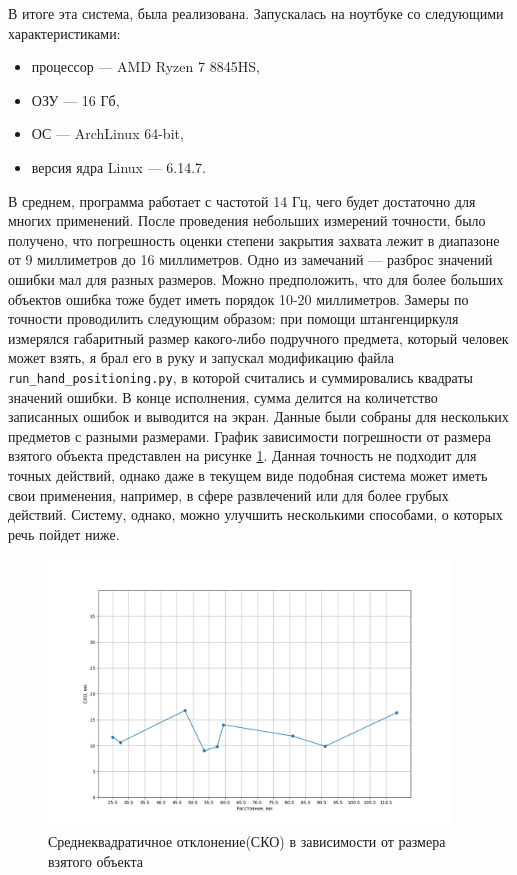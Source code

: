 \documentclass[12pt, a4paper]{article}
\begin{document}
В итоге эта система, была реализована. Запускалась на ноутбуке со следующими
характеристиками:
\begin{itemize}
  \item процессор --- AMD Ryzen 7 8845HS,
  \item ОЗУ --- 16 Гб,
  \item ОС --- ArchLinux 64-bit,
  \item версия ядра Linux --- 6.14.7.
\end{itemize}
В среднем, программа работает с частотой 14 Гц, чего будет достаточно для многих применений.
После проведения небольших измерений точности, было получено, что погрешность оценки
степени закрытия захвата лежит в диапазоне от 9 миллиметров до 16 миллиметров.
Одно из замечаний --- разброс значений ошибки мал для разных размеров. Можно
предположить, что для более больших объектов ошибка тоже будет иметь порядок
10-20 миллиметров. Замеры по точности проводилить следующим образом: при помощи
штангенциркуля измерялся габаритный размер какого-либо подручного предмета,
который человек может взять, я брал его в руку и запускал модификацию файла
\texttt{run\_hand\_positioning.py}, в которой считались и суммировались
квадраты значений ошибки. В конце исполнения, сумма делится на количетство
записанных ошибок и выводится на экран. Данные были собраны для нескольких
предметов с разными размерами. График зависимости погрешности от размера
взятого объекта представлен на рисунке \ref{fig:error-plot}. Данная точность не
подходит для точных действий, однако даже в текущем виде подобная система может
иметь свои применения, например, в сфере развлечений или для более грубых
действий. Систему, однако, можно улучшить несколькими способами, о которых речь
пойдет ниже.
\begin{figure}
  \begin{center}
    \includegraphics[width=0.95\textwidth]{images/error-plot.png}
  \end{center}
  \caption{Среднеквадратичное отклонение(СКО) в зависимости от размера взятого объекта}\label{fig:error-plot}
\end{figure}
\end{document}
